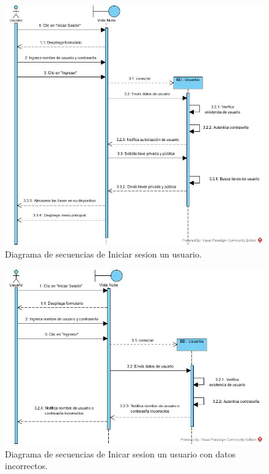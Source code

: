 \begin{figure}[htbp!]
		\centering
			\includegraphics[width=1\textwidth]{images/Iniciar_sesion}
		\caption{Diagrama de secuencias de Iniciar sesion un usuario.}
\end{figure}

\begin{figure}[htbp!]
		\centering
			\includegraphics[width=1\textwidth]{images/Iniciar_trayectoria_a}
		\caption{Diagrama de secuencias de Inicar sesion un usuario con datos incorrectos.}
\end{figure}

